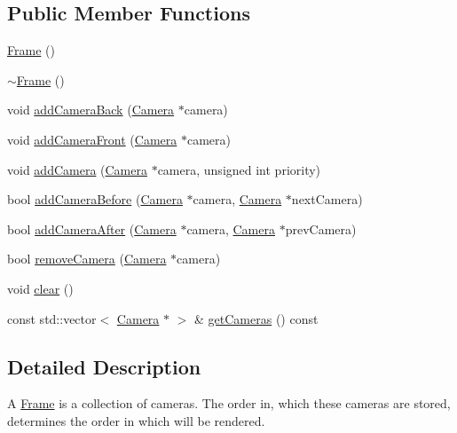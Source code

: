 \subsection*{Public Member Functions}
\begin{DoxyCompactItemize}
\item 
\mbox{\hyperlink{classec_1_1_frame_a80ed1da85818f646b6b80fb6c8a6c2a6}{Frame}} ()
\item 
\mbox{\hyperlink{classec_1_1_frame_af2b2c733cacb47d99e460a2b75667eaa}{$\sim$\+Frame}} ()
\item 
void \mbox{\hyperlink{classec_1_1_frame_a1cfcb26e088e6f6b07103af8ac9d3bfa}{add\+Camera\+Back}} (\mbox{\hyperlink{classec_1_1_camera}{Camera}} $\ast$camera)
\item 
void \mbox{\hyperlink{classec_1_1_frame_abcbaa8a587c8ad75173aacaa853bc5b2}{add\+Camera\+Front}} (\mbox{\hyperlink{classec_1_1_camera}{Camera}} $\ast$camera)
\item 
void \mbox{\hyperlink{classec_1_1_frame_a04ba39407bc0f6e78fe47f37b3f19131}{add\+Camera}} (\mbox{\hyperlink{classec_1_1_camera}{Camera}} $\ast$camera, unsigned int priority)
\item 
bool \mbox{\hyperlink{classec_1_1_frame_af1f1769a61f70a756fd762d80a676063}{add\+Camera\+Before}} (\mbox{\hyperlink{classec_1_1_camera}{Camera}} $\ast$camera, \mbox{\hyperlink{classec_1_1_camera}{Camera}} $\ast$next\+Camera)
\item 
bool \mbox{\hyperlink{classec_1_1_frame_a60b34025921413dd3ea92c9146d76825}{add\+Camera\+After}} (\mbox{\hyperlink{classec_1_1_camera}{Camera}} $\ast$camera, \mbox{\hyperlink{classec_1_1_camera}{Camera}} $\ast$prev\+Camera)
\item 
bool \mbox{\hyperlink{classec_1_1_frame_a7a93ec89a809f5b7e685c5adc73d6cda}{remove\+Camera}} (\mbox{\hyperlink{classec_1_1_camera}{Camera}} $\ast$camera)
\item 
void \mbox{\hyperlink{classec_1_1_frame_ae9896c9acff0f468a750d9eae784b23b}{clear}} ()
\item 
const std\+::vector$<$ \mbox{\hyperlink{classec_1_1_camera}{Camera}} $\ast$ $>$ \& \mbox{\hyperlink{classec_1_1_frame_a80aefbcba8339fabc3b4aa2b8b21a8bf}{get\+Cameras}} () const
\end{DoxyCompactItemize}


\subsection{Detailed Description}
A \mbox{\hyperlink{classec_1_1_frame}{Frame}} is a collection of cameras. The order in, which these cameras are stored, determines the order in which will be rendered. 

